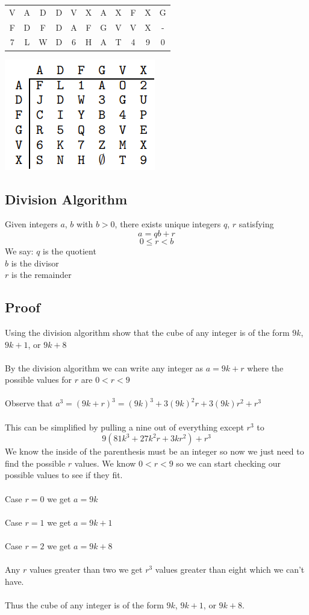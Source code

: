 \documentclass{article}
\begin{document}
\begin{center}
\begin{tabular}{ c c c c c c c c c c c }
    V & A & D & D & V & X & A & X & F & X & G\\  
    F & D & F & D & A & F & G & V & V & X & -\\
    \hline
    7 & L & W & D & 6 & H & A & T & 4 & 9 & 0 
\end{tabular}
\end{center}
\includegraphics{Cipher}\\


\subsection{Division Algorithm}

Given integers $a$, $b$ with $b > 0$, there exists unique integers $q$, $r$ satisfying $$a = qb + r$$
$$0 \le r < b$$
We say: $q$ is the quotient\\
$b$ is the divisor\\
$r$ is the remainder\\

\subsection{Proof}
Using the division algorithm show that the cube of any integer is of the form $9k$, $9k+1$, or $9k+8$\\\\
By the division algorithm we can write any integer as $a = 9k + r$ where the possible values for $r$ are $0 < r < 9$\\\\
Observe that $a^3 = (9k + r)^3 = (9k)^3 + 3(9k)^2r + 3(9k)r^2 + r^3$\\\\
This can be simplified by pulling a nine out of everything except $r^3$ to $$9(81k^3+27k^2r+3kr^2) + r^3$$
We know the inside of the parenthesis must be an integer so now we just need to find the possible $r$ values. We know $0 < r < 9$ so we can start checking our possible values to see if they fit. 
\\\\
Case $r=0$ we get $a=9k$
\\\\
Case $r=1$ we get $a=9k+1$
\\\\
Case $r=2$ we get $a=9k+8$
\\\\
Any $r$ values greater than two we get $r^3$ values greater than eight which we can't have.
\\\\
Thus the cube of any integer is of the form $9k$, $9k+1$, or $9k+8$.
\end{document}
